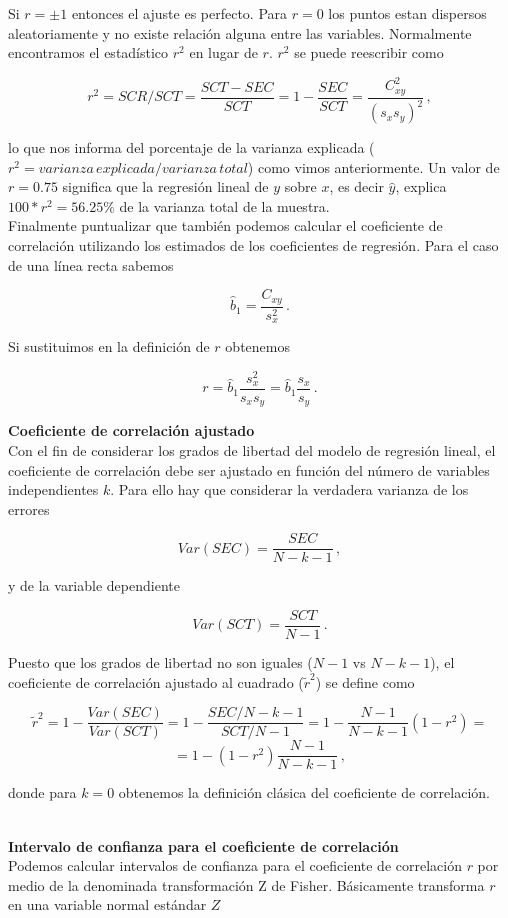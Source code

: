 \documentclass[
]{agujournal2019}
\begin{document}
\noindent Si \(r=\pm1\) entonces el ajuste es perfecto. Para \(r=0\) los
puntos estan dispersos aleatoriamente y no existe relación alguna entre
las variables. Normalmente encontramos el estadístico \(r^2\) en lugar
de \(r\). \(r^2\) se puede reescribir como

\[r^2=SCR/SCT=\frac{SCT-SEC}{SCT}=1-\frac{SEC}{SCT}=\frac{C^2_{xy}}{(s_x s_y)^2}\,,\]

lo que nos informa del porcentaje de la varianza explicada
(\(r^2={ varianza\,explicada}/{ varianza\,total}\)) como vimos
anteriormente. Un valor de \(r=0.75\) significa que la regresión lineal
de \(y\) sobre \(x\), es decir \(\hat{y}\), explica \(100*r^2=56.25\%\)
de la varianza total de la muestra.\\
\noindent Finalmente puntualizar que también podemos calcular el
coeficiente de correlación utilizando los estimados de los coeficientes
de regresión. Para el caso de una línea recta sabemos

\[\hat{b}_1=\frac{C_{xy}}{s^2_x}\,.\]

Si sustituimos en la definición de \(r\) obtenemos

\[r=\hat{b}_1\frac{s^2_x}{s_x s_y}=\hat{b}_1\frac{s_x}{s_y}\,.\]

\textbf{Coeficiente de correlación ajustado}\\

Con el fin de considerar los grados de libertad del modelo de regresión
lineal, el coeficiente de correlación debe ser ajustado en función del
número de variables independientes \(k\). Para ello hay que considerar
la verdadera varianza de los errores

\[Var(SEC)=\frac{SEC}{N-k-1}\,,\]

y de la variable dependiente

\[Var(SCT)=\frac{SCT}{N-1}\,.\]

Puesto que los grados de libertad no son iguales (\(N-1\) vs \(N-k-1\)),
el coeficiente de correlación ajustado al cuadrado (\(\tilde{r}^2\)) se
define como

\[\tilde{r}^2=1-\frac{Var(SEC)}{Var(SCT)}=1-\frac{SEC/N-k-1}{SCT/N-1}=
1-\frac{N-1}{N-k-1}(1-r^2)=\] \[=1-(1-r^2)\frac{N-1}{N-k-1}\,,\]

donde para \(k=0\) obtenemos la definición clásica del coeficiente de
correlación.\\
\strut \\
\textbf{Intervalo de confianza para el coeficiente de correlación}\\
Podemos calcular intervalos de confianza para el coeficiente de
correlación \(r\) por medio de la denominada transformación Z de Fisher.
Básicamente transforma \(r\) en una variable normal estándar \(Z\)
\end{document}

